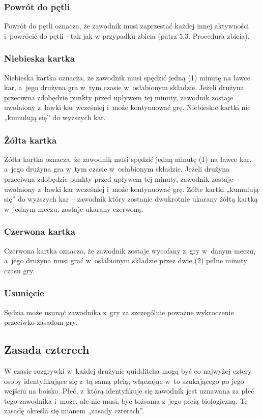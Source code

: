 \documentclass[12pt,a4paper]{article}
\begin{document}
\subsubsection{Powrót do pętli}
Powrót do pętli oznacza, że
zawodnik musi zaprzestać każdej innej aktywności i~powrócić do pętli - tak jak
w przypadku zbicia (patrz 5.3. Procedura zbicia).

\subsubsection{Niebieska kartka}
Niebieska kartka oznacza, że
zawodnik musi spędzić jedną (1) minutę na ławce kar, a~jego drużyna gra w~tym czasie w~osłabionym składzie. Jeżeli drużyna przeciwna zdobędzie punkty przed upływem tej minuty, zawodnik zostaje uwolniony z~ławki kar wcześniej i~może kontynuować grę. Niebieskie kartki nie „kumulują się” do wyższych kar. 

\subsubsection{Żółta kartka}
Żółta kartka oznacza, że zawodnik musi spędzić jedną minutę (1) na ławce kar, a~jego drużyna gra w~tym czasie w~osłabionym składzie. Jeżeli drużyna przeciwna zdobędzie punkty przed upływem tej minuty, zawodnik zostaje uwolniony z~ławki kar wcześniej i~może kontynuować grę. Żółte kartki „kumulują się” do wyższych kar – zawodnik który zostanie dwukrotnie ukarany żółtą kartką w~jednym meczu, zostaje ukarany czerwoną.

\subsubsection{Czerwona kartka}
Czerwona kartka oznacza, że zawodnik zostaje wycofany z~gry w~danym meczu, a~jego drużyna musi grać w~osłabionym składzie przez dwie (2) pełne minuty czasu gry.

\subsubsection{Usunięcie}
Sędzia może usunąć zawodnika z~gry za
szczególnie poważne wykroczenie przeciwko zasadom gry.

\subsection{Zasada czterech}
W czasie rozgrywki w~każdej drużynie quidditcha mogą być co najwyżej cztery osoby identyfikujące się z~tą samą płcią, włączając w~to szukającego po jego wejściu na boisko. Płeć, z~którą identyfikuje się zawodnik jest uznawana za płeć tego zawodnika i~może, ale nie musi, być tożsama z~jego płcią biologiczną. Tę zasadę określa się mianem „zasady czterech”.
\end{document}
